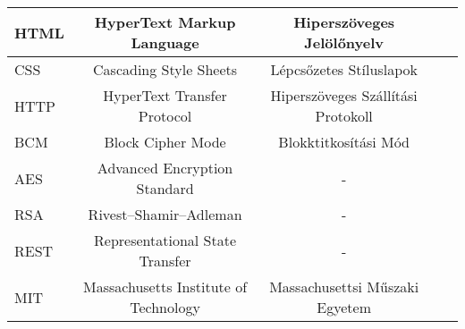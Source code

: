 \begin{table}[h!]
\begin{tabular}{ | l | c | c | c | c |}
		\hline
		HTML & HyperText Markup Language & Hiperszöveges Jelölőnyelv \\
		\hline
		CSS & Cascading Style Sheets & Lépcsőzetes Stíluslapok \\
		\hline
		HTTP & HyperText Transfer Protocol & Hiperszöveges Szállítási Protokoll \\
		\hline
		BCM & Block Cipher Mode & Blokktitkosítási Mód \\
		\hline
		AES & Advanced Encryption Standard & - \\
		\hline
		RSA & Rivest–Shamir–Adleman & - \\
		\hline
		REST & Representational State Transfer & - \\
		\hline
		MIT & Massachusetts Institute of Technology & Massachusettsi Műszaki Egyetem \\
		\hline
		\end{tabular}
		\label{tablazat1}
\end{table}